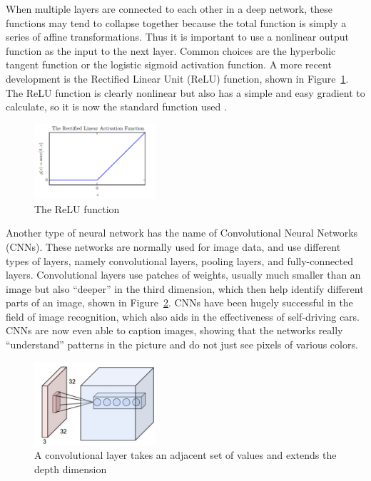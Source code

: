 \documentclass[]{report}
\begin{document}
When multiple layers are connected to each other in a deep network, these functions may tend to collapse together because the total function is simply a series of affine transformations. Thus it is important to use a nonlinear output function as the input to the next layer. Common choices are the hyperbolic tangent function or the logistic sigmoid activation function. A more recent development is the Rectified Linear Unit (ReLU) function, shown in Figure~\ref{relu}. The ReLU function is clearly nonlinear but also has a simple and easy gradient to calculate, so it is now the standard function used \cite{Goodfellow-et-al-2016,ThreeGiants}.

\begin{figure}
	\centering
	\includegraphics[width=0.4\textwidth]{../images/relu}
	\caption{The ReLU function \cite{Goodfellow-et-al-2016}}
	\label{relu}
\end{figure}



Another type of neural network has the name of Convolutional Neural Networks (CNNs). These networks are normally used for image data, and use different types of layers, namely convolutional layers, pooling layers, and fully-connected layers. Convolutional layers use patches of weights, usually much smaller than an image but also ``deeper'' in the third dimension, which then help identify different parts of an image, shown in Figure~\ref{convolution-exp}. CNNs have been hugely successful in the field of image recognition, which also aids in the effectiveness of self-driving cars. CNNs are now even able to caption images, showing that the networks really ``understand'' patterns in the picture and do not just see pixels of various colors.


\begin{figure}
	\centering
	\includegraphics[width=0.4\textwidth]{../images/convolutions2}
	\caption{A convolutional layer takes an adjacent set of values and extends the depth dimension \cite{karpathy}}
	\label{convolution-exp}
\end{figure}
\end{document}
